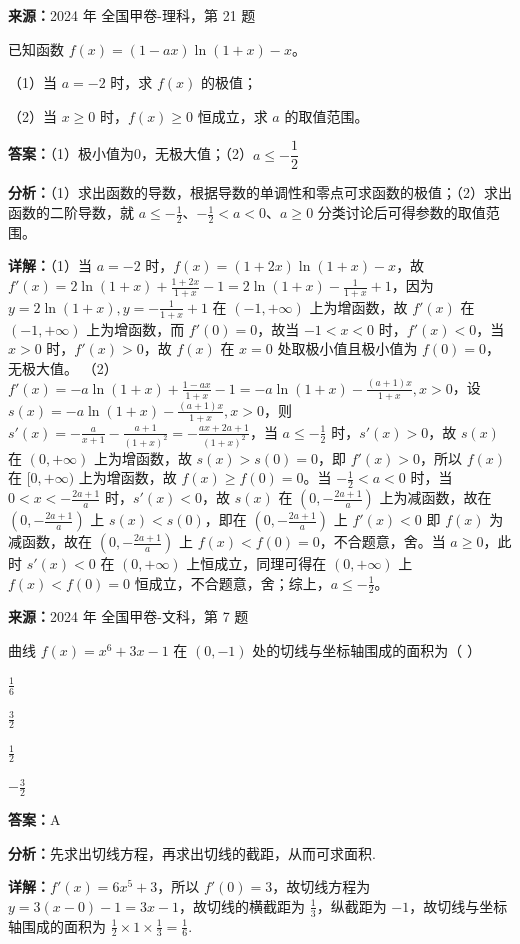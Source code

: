 \begin{question}[points=12]
\textbf{来源：}2024 年 全国甲卷-理科，第 21 题\par
已知函数 $f(x)=(1-ax)\ln(1+x)-x$。

（1）当 $a=-2$ 时，求 $f(x)$ 的极值；

（2）当 $x\ge0$ 时，$f(x)\ge0$ 恒成立，求 $a$ 的取值范围。
\begin{solution}
\textbf{答案：}（1）极小值为0，无极大值；（2）$a\le -\dfrac{1}{2}$

\textbf{分析：}（1）求出函数的导数，根据导数的单调性和零点可求函数的极值；（2）求出函数的二阶导数，就 $a\le -\frac{1}{2}$、$-\frac{1}{2}<a<0$、$a\ge0$ 分类讨论后可得参数的取值范围。

\textbf{详解：}（1）当 $a=-2$ 时，$f(x)=(1+2x)\ln(1+x)-x$，故 $f'(x)=2\ln(1+x)+\frac{1+2x}{1+x}-1=2\ln(1+x)-\frac{1}{1+x}+1$，因为 $y=2\ln(1+x),y=-\frac{1}{1+x}+1$ 在 $(-1,+\infty)$ 上为增函数，故 $f'(x)$ 在 $(-1,+\infty)$ 上为增函数，而 $f'(0)=0$，故当 $-1<x<0$ 时，$f'(x)<0$，当 $x>0$ 时，$f'(x)>0$，故 $f(x)$ 在 $x=0$ 处取极小值且极小值为 $f(0)=0$，无极大值。
（2）$f'(x)=-a\ln(1+x)+\frac{1-ax}{1+x}-1=-a\ln(1+x)-\frac{(a+1)x}{1+x},x>0$，设 $s(x)=-a\ln(1+x)-\frac{(a+1)x}{1+x},x>0$，则 $s'(x)=-\frac{a}{x+1}-\frac{a+1}{(1+x)^2}=-\frac{ax+2a+1}{(1+x)^2}$，当 $a\le -\frac{1}{2}$ 时，$s'(x)>0$，故 $s(x)$ 在 $(0,+\infty)$ 上为增函数，故 $s(x)>s(0)=0$，即 $f'(x)>0$，所以 $f(x)$ 在 $[0,+\infty)$ 上为增函数，故 $f(x)\ge f(0)=0$。当 $-\frac{1}{2}<a<0$ 时，当 $0<x<-\frac{2a+1}{a}$ 时，$s'(x)<0$，故 $s(x)$ 在 $(0,-\frac{2a+1}{a})$ 上为减函数，故在 $(0,-\frac{2a+1}{a})$ 上 $s(x)<s(0)$，即在 $(0,-\frac{2a+1}{a})$ 上 $f'(x)<0$ 即 $f(x)$ 为减函数，故在 $(0,-\frac{2a+1}{a})$ 上 $f(x)<f(0)=0$，不合题意，舍。当 $a\ge0$，此时 $s'(x)<0$ 在 $(0,+\infty)$ 上恒成立，同理可得在 $(0,+\infty)$ 上 $f(x)<f(0)=0$ 恒成立，不合题意，舍；综上，$a\le -\frac{1}{2}$。
\end{solution}
\end{question}

\begin{question}[points=5]
\textbf{来源：}2024 年 全国甲卷-文科，第 7 题\par
曲线 $f(x) = x^6 + 3x - 1$ 在 $(0,-1)$ 处的切线与坐标轴围成的面积为（ ）
\begin{choices}
  \item $\frac{1}{6}$
  \item $\frac{3}{2}$
  \item $\frac{1}{2}$
  \item $-\frac{3}{2}$
\end{choices}
\begin{solution}
\textbf{答案：}A

\textbf{分析：}先求出切线方程，再求出切线的截距，从而可求面积.

\textbf{详解：}$f'(x) = 6x^5 + 3$，所以 $f'(0) = 3$，故切线方程为 $y = 3(x-0) - 1 = 3x - 1$，故切线的横截距为 $\frac{1}{3}$，纵截距为 $-1$，故切线与坐标轴围成的面积为 $\frac{1}{2} \times 1 \times \frac{1}{3} = \frac{1}{6}$.
\end{solution}
\end{question}


